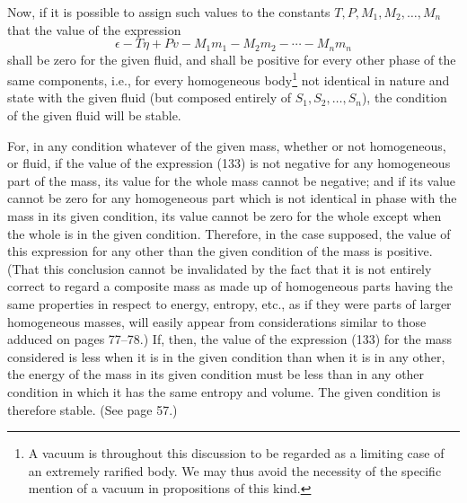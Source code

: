 \documentclass[11pt]{article}
\newcommand{\eps}{\epsilon}
\begin{document}
Now, if it is possible to assign such values to the constants \(T,P,M_1,M_2,\ldots,M_n\) that the value of the expression
\begin{equation}
\eps-T\eta+Pv-M_1m_1-M_2m_2-\cdots-M_nm_n
\end{equation}
shall be zero for the given fluid, and shall be positive for every other phase of the same components, i.e., for every homogeneous body\footnote{A vacuum is throughout this discussion to be regarded as a limiting case of an extremely rarified body. We may thus avoid the necessity of the specific mention of a vacuum in propositions of this kind.} not identical in nature and state with the given fluid (but composed entirely of \(S_1,S_2,
\ldots,S_n\)), the condition of the given fluid will be stable.

For, in any condition whatever of the given mass, whether or not homogeneous, or fluid, if the value of the expression (133) is not negative for any homogeneous part of the mass, its value for the whole mass cannot be negative; and if its value cannot be zero for any homogeneous part which is not identical in phase with the mass in its given condition, its value cannot be zero for the whole except when the whole is in the given condition. Therefore, in the case supposed, the value of this expression for any other than the given condition of the mass is positive. (That this conclusion cannot be invalidated by the fact that it is not entirely correct to regard a composite mass as made up of homogeneous parts having the same properties in respect to energy, entropy, etc., as if they were parts of larger homogeneous masses, will easily appear from considerations similar to those adduced on pages 77--78.) If, then, the value of the expression (133) for the mass considered is less when it is in the given condition than when it is in any other, the energy of the mass in its given condition must be less than in any other condition in which it has the same entropy and volume. The given condition is therefore stable. (See page 57.)
\end{document}

